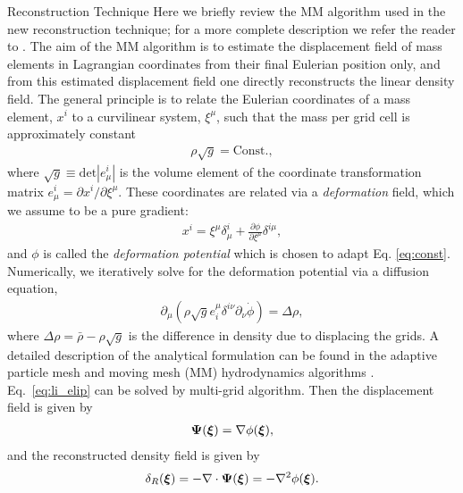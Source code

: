 \begin{section}{Reconstruction Technique}
  \label{sec:reconstruction}
  Here we briefly review the MM algorithm used in the new reconstruction technique; for a more
  complete description we refer the reader to \cite{bib:ZhuH2016}.  
  The aim of the MM algorithm is to estimate the displacement field of mass elements in 
  Lagrangian coordinates from their final Eulerian position only, and from this
  estimated displacement field one directly reconstructs the linear density field. The
  general principle is to relate the Eulerian coordinates of a mass element, $x^i$ to
  a curvilinear system, $\xi^\mu$, such that the mass
  per grid cell is approximately constant
  \begin{align}
   \label{eq:const}
    \rho \sqrt{g}=\mathrm{Const.},
  \end{align}
  where $\sqrt{g} \equiv \mathrm{det}\left| e^i_\mu\right|$ is the volume
  element of the coordinate transformation matrix $e^i_\mu = \partial x^i / \partial \xi ^ \mu$. 
  These coordinates are
  related via a {\it deformation} field, which we assume to be a pure
  gradient:
  \begin{align}
    x^i = \xi^\mu \delta^i_\mu + \frac{\partial \phi}{\partial
    \xi^\mu}\delta^{i\mu},
  \end{align}
  and $\phi$ is called the {\it deformation potential} which is chosen to adapt Eq. \ref{eq:const}.  
  Numerically, we iteratively solve for
  the deformation potential via a diffusion equation, 
  \begin{align}
    \label{eq:li_elip}
    \partial _\mu (\rho \sqrt{g} e^\mu _i \delta^{i\nu}
    \partial_\nu \dot{\phi})=\Delta \rho,
  \end{align}
  where $\Delta \rho = \bar{\rho}-\rho \sqrt{g}$ is the difference in density 
  due to displacing the grids. A detailed description 
  of the analytical formulation can be found in the adaptive
  particle mesh and moving mesh (MM) hydrodynamics algorithms \cite{bib:Pen1995,bib:Pen1998}.
  Eq.~\ref{eq:li_elip} can be solved by multi-grid
  algorithm\cite{bib:Pen1995,bib:Pen1998,bib:ZhuH2016}.
  Then the displacement field is given by
  \begin{align}
   \label{eq:disp}
   \boldsymbol{\Psi}(\boldsymbol{\xi})=\nabla \phi(\boldsymbol{\xi}),
  \end{align}
  and the reconstructed density field is given by
  \begin{align}
   \label{eq:delta}
   \delta_R(\boldsymbol{\xi})=- \nabla \cdot \boldsymbol{\Psi}(\boldsymbol{\xi}) = - \nabla^2 \phi(\boldsymbol{\xi}). 
  \end{align}

\end{section}

